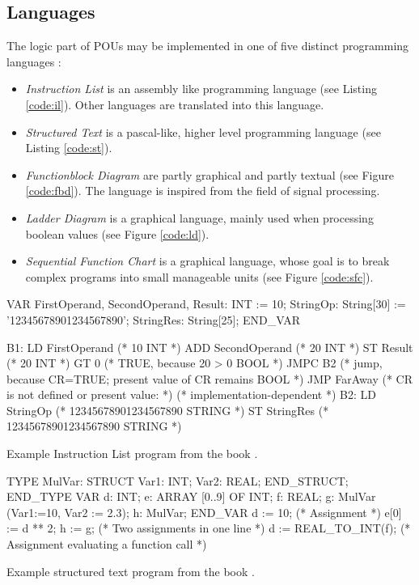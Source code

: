 \subsection{Languages}
\label{sub:iec-lang}
The logic part of POUs may be implemented in one of five distinct programming languages \cite{johnIEC611313Programming2010}:
\begin{itemize}
	\item \emph{Instruction List} is an assembly like programming language (see Listing \ref{code:il}). Other languages are translated into this language.
	\item \emph{Structured Text} is a pascal-like, higher level programming language (see Listing \ref{code:st}).
	\item \emph{Functionblock Diagram} are partly graphical and partly textual (see Figure \ref{code:fbd}). The language is inspired from the field of signal processing. 
	\item \emph{Ladder Diagram} is a graphical language, mainly used when processing boolean values (see Figure \ref{code:ld}).
	\item \emph{Sequential Function Chart} is a graphical language, whose goal is to break complex programs into small manageable units (see Figure \ref{code:sfc}). 
\end{itemize}


\begin{program}
	\begin{GenericCode}
VAR
	FirstOperand, SecondOperand, Result: INT := 10;
	StringOp: String[30] := '12345678901234567890';
	StringRes: String[25];
END_VAR

B1:	LD FirstOperand (* 10 {INT} *)
		ADD SecondOperand (* 20 {INT} *)
		ST Result (* 20 {INT} *)
		GT 0 (* TRUE, because 20 > 0 {BOOL} *)
		JMPC B2
		(* jump, because CR=TRUE; present value of CR remains {BOOL} *)
		JMP FarAway (* CR is not defined or present value: *)
		(* implementation-dependent *)
B2: LD StringOp (* 12345678901234567890 {STRING} *)
		ST StringRes (* 12345678901234567890 {STRING} *)\end{GenericCode}
	\caption{Example Instruction List program from the book \cite{johnIEC611313Programming2010}.}
	\label{code:il}
\end{program}

\begin{program}
	\begin{GenericCode}
TYPE MulVar: STRUCT Var1: INT; Var2: REAL; END_STRUCT; END_TYPE
VAR d: INT;
	e: ARRAY [0..9] OF INT; 
	f: REAL;
	g: MulVar (Var1:=10, Var2 := 2.3); 
	h: MulVar;
END_VAR
d := 10; (* Assignment *)
e[0] := d ** 2;   h  := g; (* Two assignments in one line *)
d := REAL_TO_INT(f); (* Assignment evaluating a function call *)\end{GenericCode}
	\caption{Example structured text program from the book \cite{johnIEC611313Programming2010}.}
	\label{code:st}
\end{program}

